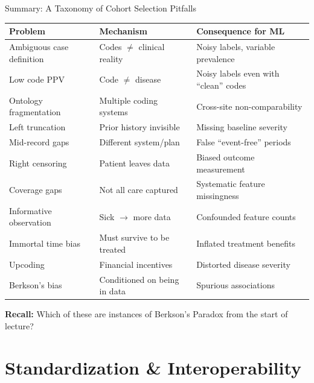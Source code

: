 \documentclass[aspectratio=169,10pt]{beamer}
\begin{document}
\begin{frame}{Summary: A Taxonomy of Cohort Selection Pitfalls}
\begin{center}
\scriptsize
\begin{tabular}{p{3cm}p{3.5cm}p{5.5cm}}
\toprule
\textbf{Problem} & \textbf{Mechanism} & \textbf{Consequence for ML} \\
\midrule
Ambiguous case definition & Codes $\neq$ clinical reality & Noisy labels, variable prevalence \\
Low code PPV & Code $\neq$ disease & Noisy labels even with ``clean'' codes \\
Ontology fragmentation & Multiple coding systems & Cross-site non-comparability \\
Left truncation & Prior history invisible & Missing baseline severity \\
Mid-record gaps & Different system/plan & False ``event-free'' periods \\
Right censoring & Patient leaves data & Biased outcome measurement \\
Coverage gaps & Not all care captured & Systematic feature missingness \\
Informative observation & Sick $\to$ more data & Confounded feature counts \\
Immortal time bias & Must survive to be treated & Inflated treatment benefits \\
Upcoding & Financial incentives & Distorted disease severity \\
\alert{Berkson's bias} & \alert{Conditioned on being in data} & \alert{Spurious associations} \\
\bottomrule
\end{tabular}
\end{center}

\vspace{0.2em}
\textbf{Recall:} Which of these are instances of Berkson's Paradox from the start of lecture?
\end{frame}

\section{Standardization \& Interoperability}
\end{document}
